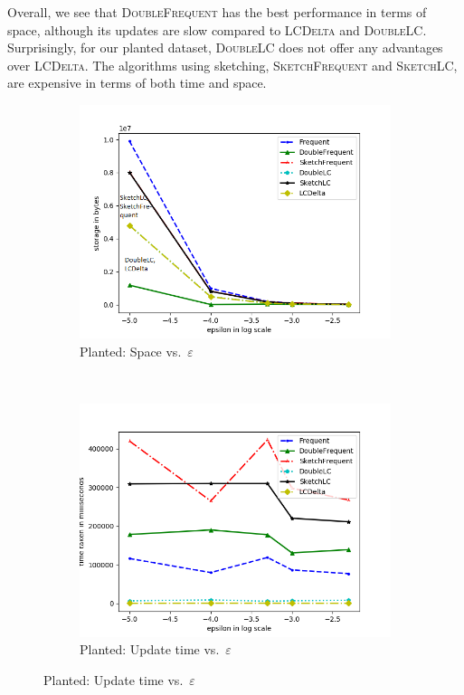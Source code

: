 \documentclass[sigconf,review=true,anonymous=true,screen]{acmart}
\newcommand{\eps}{\varepsilon}
\begin{document}
Overall, we see that \textsc{DoubleFrequent} has the best performance in terms of space, although its updates are slow compared to \textsc{LCDelta} and \textsc{DoubleLC}. Surprisingly, for our planted dataset, \textsc{DoubleLC} does not offer any advantages over \textsc{LCDelta}. The algorithms using sketching, \textsc{SketchFrequent} and \textsc{SketchLC}, are expensive in terms of both time and space. 
\begin{figure}
\centering
\begin{subfigure}[b]{0.33\textwidth}
\includegraphics[width=\textwidth]{../Plots/storage_epsilon.png}
\caption{Planted: Space vs.~$\eps$}
\label{fig:plspeps}
\end{subfigure}
~
\begin{subfigure}[b]{0.33\textwidth}
\includegraphics[width=\textwidth]{../Plots/time_epsilon.png}
\caption{Planted: Update time vs.~$\eps$}
\label{fig:pltimeps}
\end{subfigure}


\end{figure}
\end{document}

